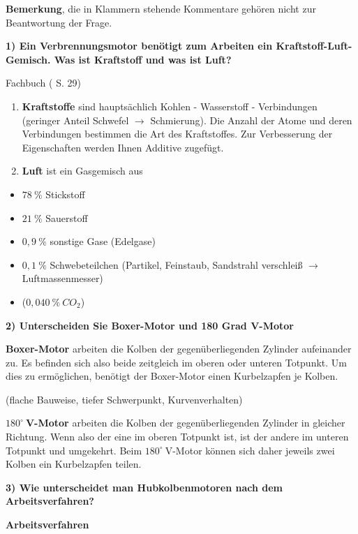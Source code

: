 \textbf{Bemerkung}, die in Klammern stehende Kommentare gehören nicht
zur Beantwortung der Frage.

\textbf{1) Ein Verbrennungsmotor benötigt zum Arbeiten ein
Kraftstoff-Luft-Gemisch. Was ist Kraftstoff und was ist Luft?}

Fachbuch (\textcite{brand:2020:fachkundeKfz} S. 29)

\begin{enumerate}
\def\labelenumi{(\arabic{enumi})}
\item
  \textbf{Kraftstoffe} sind hauptsächlich Kohlen - Wasserstoff -
  Verbindungen (geringer Anteil Schwefel $\to$ Schmierung). Die Anzahl
  der Atome und deren Verbindungen bestimmen die Art des Kraftstoffes.
  Zur Verbesserung der Eigenschaften werden Ihnen Additive zugefügt.
\item
  \textbf{Luft} ist ein Gasgemisch aus
\end{enumerate}

\begin{itemize}
\item
  $78~\%$ Stickstoff
\item
  $21~\%$ Sauerstoff
\item
  $0,9~\%$ sonstige Gase (Edelgase)
\item
  $0,1~\%$ Schwebeteilchen (Partikel, Feinstaub, Sandstrahl verschleiß
  $\to$ Luftmassenmesser)
\item
  ($0,040~\% ~ CO_2$)
\end{itemize}

\textbf{2) Unterscheiden Sie Boxer-Motor und 180 Grad V-Motor}

\textbf{Boxer-Motor} arbeiten die Kolben der gegenüberliegenden Zylinder
aufeinander zu. Es befinden sich also beide zeitgleich im oberen oder
unteren Totpunkt. Um dies zu ermöglichen, benötigt der Boxer-Motor einen
Kurbelzapfen je Kolben.

(flache Bauweise, tiefer Schwerpunkt, Kurvenverhalten)

$180^\circ~$\textbf{V-Motor} arbeiten die Kolben der
gegenüberliegenden Zylinder in gleicher Richtung. Wenn also der eine im
oberen Totpunkt ist, ist der andere im unteren Totpunkt und umgekehrt.
Beim $180^\circ~$V-Motor können sich daher jeweils zwei Kolben ein
Kurbelzapfen teilen.

\textbf{3) Wie unterscheidet man Hubkolbenmotoren nach dem
Arbeitsverfahren?}

\textbf{Arbeitsverfahren}


